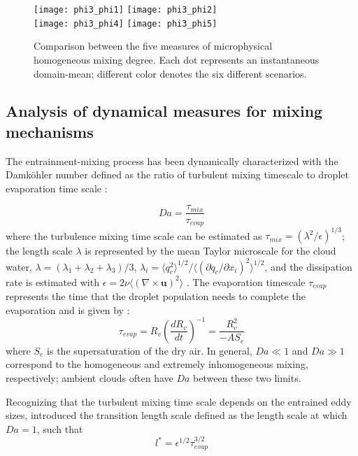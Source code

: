 \documentclass[draft,linenumbers]{agujournal}
\begin{document}
\begin{figure}[!htbp]\centering
\texttt{[image: phi3\_phi1]}
\texttt{[image: phi3\_phi2]}\\
\texttt{[image: phi3\_phi4]}
\texttt{[image: phi3\_phi5]}
\caption{Comparison between the five measures of microphysical homogeneous mixing degree. Each dot represents an instantaneous domain-mean; different color denotes the six different scenarios.\label{phi_compare}}
\end{figure}

\subsection{Analysis of dynamical measures for mixing mechanisms}
The entrainment-mixing process has been dynamically characterized with the Damk{\"o}hler number defined as the ratio of 
turbulent mixing timescale to droplet evaporation time scale
\citep{Baker1980, Krueger1997Modeling, Grabowski1993Cumulus}:

\begin{equation}
Da=\frac{\tau_{mix}}{\tau_{evap}}\label{eq:DaNumber}
\end{equation}
where the turbulence mixing time scale can be estimated as $\tau_{mix} = (\lambda^2/\epsilon)^{1/3}$; the length scale $\lambda$ is represented by the mean Taylor microscale for the cloud water, $\lambda = 
(\lambda_1+\lambda_2+\lambda_3)/3$, $\lambda_i = \langle q_c^2\rangle^{1/2}/\langle(\partial q_c/\partial x_i)^2\rangle^{1/2}$, and the dissipation rate is estimated with $\epsilon = 2\nu\langle(\nabla\times \mathbf{u})^2\rangle$ \citep{And09}. The evaporation timescale $\tau_{evap}$ represents the time that the 
droplet population needs to complete the evaporation and is given by 
\citet{And09, Burnet2007Observational}:
\begin{equation}
\tau_{evap} = R_v(\frac{dR_v}{dt})^{-1} = \frac{R_v^2}{-AS_e}
\end{equation}
where $S_e$ is the supersaturation of the dry air. In general, $Da \ll 1$ and $Da \gg 1$ correspond to the homogeneous and extremely inhomogeneous mixing, respectively; ambient clouds often have $Da$ between these two limits.

Recognizing that the turbulent mixing time scale depends on the entrained eddy sizes, \citet{Lehmann2009} introduced the transition length scale defined as the length scale at which $Da = 1$, such that
\begin{equation}
l^{*}=\epsilon^{1/2}\tau_{evap}^{3/2}
\end{equation}
\end{document}
